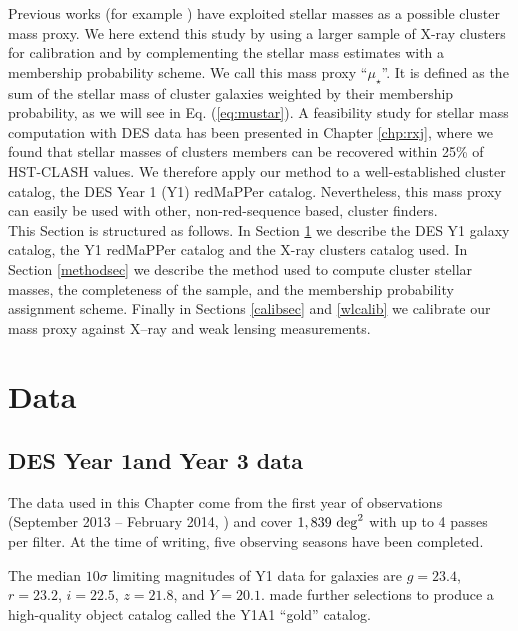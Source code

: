 Previous works (for example \citealt{andreon12}) have exploited stellar masses as a possible cluster mass proxy. We here extend this study by using a larger sample of X-ray clusters for calibration and by complementing the stellar mass estimates with a membership probability scheme. We call this mass proxy ``$\mu_\star$''. It is defined as the sum of the stellar mass of cluster galaxies weighted by their membership probability, as we will see in Eq. (\ref{eq:mustar}). A feasibility study for stellar mass computation with DES data has been presented in Chapter \ref{chp:rxj}, where we found that stellar masses of clusters members can be recovered within 25\% of HST-CLASH values. We therefore apply our method to a well-established cluster catalog, the DES Year 1 (Y1) redMaPPer catalog. Nevertheless, this mass proxy can easily be used with other, non-red-sequence based, cluster finders.\\

This Section is structured as follows. In Section \ref{datasec} we describe the DES Y1 galaxy catalog, the Y1 redMaPPer catalog  and the X-ray clusters catalog used. In Section \ref{methodsec} we describe the method used to compute cluster stellar masses, the completeness of the sample, and the membership probability assignment scheme. Finally in Sections \ref{calibsec} and \ref{wlcalib} we calibrate our mass proxy against X--ray and weak lensing measurements.

\section{Data}\label{datasec}

\subsection{DES Year 1and Year 3 data}
The data used in this Chapter come from the first year of observations (September 2013 -- February 2014, \citealt{y1}) and cover $1,839~ {\rm deg}^2$ with up to 4 passes per filter. At the time of writing, five observing seasons have been completed.

The median $10\sigma$ limiting magnitudes of Y1 data for galaxies are $g = 23.4$, $r = 23.2$, $i = 22.5$, $z = 21.8$, and $Y = 20.1$.
\citet{firstyear} made further selections to produce a high-quality object catalog called the Y1A1 ``gold'' catalog.

